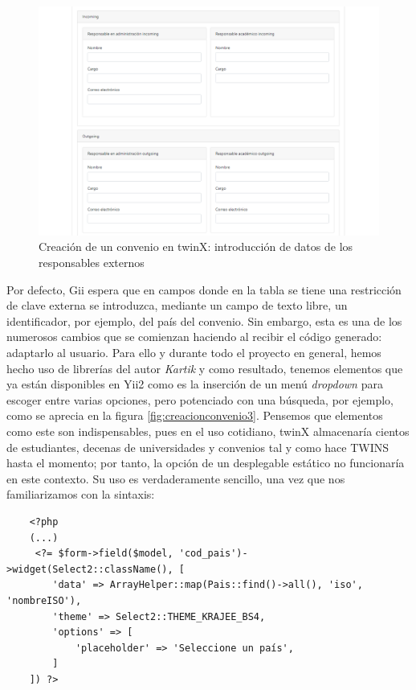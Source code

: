 \begin{figure}
	\centering
	\includegraphics[width=\textwidth]{Capturas de twinX/creacion_convenio_2}
	\caption[Creación de un convenio en twinX 2]{Creación de un convenio en twinX: introducción de datos de los responsables externos}
	\label{fig:creacionconvenio2}
\end{figure}

Por defecto, Gii espera que en campos donde en la tabla se tiene una restricción de clave externa se introduzca, mediante un campo de texto libre, un identificador, por ejemplo, del país del convenio. Sin embargo, esta es una de los numerosos cambios que se comienzan haciendo al recibir el código generado: adaptarlo al usuario. Para ello y durante todo el proyecto en general, hemos hecho uso de librerías del autor \textit{Kartik} \cite{krajee} y como resultado, tenemos elementos que ya están disponibles en Yii2 como es la inserción de un menú \textit{dropdown} para escoger entre varias opciones, pero potenciado con una búsqueda, por ejemplo, como se aprecia en la figura \ref{fig:creacionconvenio3}. Pensemos que elementos como este son indispensables, pues en el uso cotidiano, twinX almacenaría cientos de estudiantes, decenas de universidades y convenios tal y como hace TWINS hasta el momento; por tanto, la opción de un desplegable estático no funcionaría en este contexto. Su uso es verdaderamente sencillo, una vez que nos familiarizamos con la sintaxis:

\begin{verbatim}
	<?php
	(...)	
	 <?= $form->field($model, 'cod_pais')->widget(Select2::className(), [
		'data' => ArrayHelper::map(Pais::find()->all(), 'iso', 'nombreISO'),
		'theme' => Select2::THEME_KRAJEE_BS4,
		'options' => [
			'placeholder' => 'Seleccione un país',
		]
	]) ?>
	
\end{verbatim}


